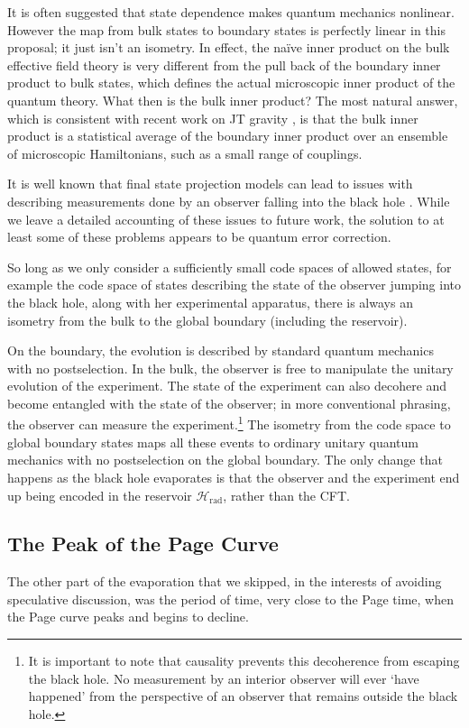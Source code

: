 \documentclass[12pt]{article}
\begin{document}
It is often suggested that state dependence makes quantum mechanics nonlinear. However the map from bulk states to boundary states is perfectly linear in this proposal; it just isn't an isometry. In effect, the na\"{i}ve inner product on the bulk effective field theory is very different from the pull back of the boundary inner product to bulk states, which defines the actual microscopic inner product of the quantum theory. What then is the bulk inner product? The most natural answer, which is consistent with recent work on JT gravity \cite{saad2019jt}, is that the bulk inner product is a statistical average of the boundary inner product over an ensemble of microscopic Hamiltonians, such as a small range of couplings.

It is well known that final state projection models can lead to issues with describing measurements done by an observer falling into the black hole \cite{lloyd2014unitarity, bousso2014measurements, marolf2017black}. While we leave a detailed accounting of these issues to future work, the solution to at least some of these problems appears to be quantum error correction. 

So long as we only consider a sufficiently small code spaces of allowed states, for example the code space of states describing the state of the observer jumping into the black hole, along with her experimental apparatus, there is always an isometry from the bulk to the global boundary (including the reservoir). 

On the boundary, the evolution is described by standard quantum mechanics with no postselection. In the bulk, the observer is free to manipulate the unitary evolution of the experiment. The state of the experiment can also decohere and become entangled with the state of the observer; in more conventional phrasing, the observer can measure the experiment.\footnote{It is important to note that causality prevents this decoherence from escaping the black hole. No measurement by an interior observer will ever `have happened' from the perspective of an observer that remains outside the black hole.} The isometry from the code space to global boundary states maps all these events to ordinary unitary quantum mechanics with no postselection on the global boundary. The only change that happens as the black hole evaporates is that the observer and the experiment end up being encoded in the reservoir $\mathcal{H}_\text{rad}$, rather than the CFT.

\subsection{The Peak of the Page Curve}
The other part of the evaporation that we skipped, in the interests of avoiding speculative discussion, was the period of time, very close to the Page time, when the Page curve peaks and begins to decline. 
\end{document}
